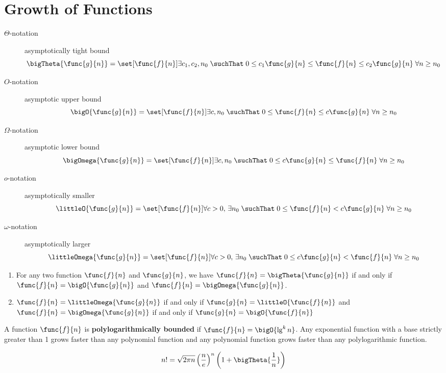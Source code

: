 \chapter{Growth of Functions}
\begin{definition} \leavevmode
    \begin{description}
        \item[\(\Theta\)-notation] asymptotically tight bound
              \[ \bigTheta{\func{g}{n}} = \set[\func{f}{n}]{ \exists c_1,c_2,n_0 \; \suchThat \; 0 \leq c_1\func{g}{n} \leq \func{f}{n} \leq c_2 \func{g}{n} \; \forall n \geq n_0} \]
        \item [\(O\)-notation] asymptotic upper bound
              \[ \bigO{\func{g}{n}} = \set[\func{f}{n}]{ \exists c,n_0 \; \suchThat \; 0 \leq \func{f}{n} \leq c \func{g}{n} \; \forall n \geq n_0} \]
        \item [\(\Omega\)-notation] asymptotic lower bound
              \[ \bigOmega{\func{g}{n}} = \set[\func{f}{n}]{ \exists c,n_0 \; \suchThat \; 0 \leq c \func{g}{n} \leq \func{f}{n} \; \forall n \geq n_0} \]
        \item [\(o\)-notation] asymptotically smaller
              \[ \littleO{\func{g}{n}} = \set[\func{f}{n}]{ \forall c > 0, \, \exists n_0 \; \suchThat \; 0 \leq \func{f}{n} < c \func{g}{n} \; \forall n \geq n_0} \]
        \item [\(\omega\)-notation] asymptotically larger
              \[ \littleOmega{\func{g}{n}} = \set[\func{f}{n}]{ \forall c > 0, \, \exists n_0 \; \suchThat \; 0 \leq c \func{g}{n}< \func{f}{n}  \; \forall n \geq n_0} \]
    \end{description}
\end{definition}

\begin{proposition} \leavevmode
    \begin{enumerate}
        \item For any two function \(\func{f}{n}\) and \(\func{g}{n}\), we have \(\func{f}{n} = \bigTheta{\func{g}{n}}\) if and only if \(\func{f}{n} = \bigO{\func{g}{n}}\) and \(\func{f}{n} = \bigOmega{\func{g}{n}}\).
        \item \(\func{f}{n} = \littleOmega{\func{g}{n}}\) if and only if \(\func{g}{n} = \littleO{\func{f}{n}}\) and \(\func{f}{n} = \bigOmega{\func{g}{n}}\) if and only if \(\func{g}{n} = \bigO{\func{f}{n}}\)
    \end{enumerate}
\end{proposition}
A function \(\func{f}{n}\) is \textbf{polylogarithmically bounded} if  \(\func{f}{n} = \bigO{\lg^k n}\). Any exponential function with a base strictly greater than 1 grows faster than any polynomial function and any polynomial function grows faster than any polylogarithmic function.
\begin{remark}
    \begin{equation}
        n! = \sqrt{2\pi n} \left(\frac{n}{e}\right)^n \left(1 + \bigTheta{\frac{1}{n}}\right)
    \end{equation}
\end{remark}

